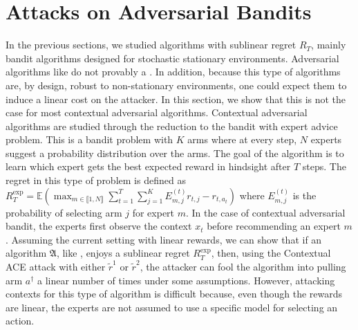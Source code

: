 \section{Attacks on Adversarial Bandits}\label{app:adversarial_rewards}
In the previous sections, we studied algorithms with sublinear regret $R_T$, \ie mainly bandit algorithms designed for stochastic stationary environments. Adversarial algorithms like \expfour do not provably  a . In addition, because this type of algorithms are, by design, robust to non-stationary environments, one could expect them to induce a linear cost on the attacker. In this section, we show that this is not the case for most contextual adversarial algorithms. Contextual adversarial algorithms are studied through the reduction to the bandit with expert advice problem. This is a bandit problem with $K$ arms where at every step, $N$ experts suggest a probability distribution over the arms. The goal of the algorithm is to learn which expert gets the best expected reward in hindsight after $T$ steps. The regret in this type of problem is defined as $R_{T}^{\text{exp}} = \mathbb{E}\left( \max_{m\in \llbracket 1, N \rrbracket}\sum_{t=1}^{T} \sum_{j=1}^{K} E_{m,j}^{(t)}r_{t,j} - r_{t,a_{t}}\right)$
where $E_{m,j}^{(t)}$ is the probability of selecting arm $j$ for expert $m$. In the case of contextual adversarial bandit, the experts first observe the context $x_{t}$ before recommending an expert $m$. 
Assuming the current setting with linear rewards, we can show that if an algorithm $\mathfrak{A}$, like \expfour, enjoys a sublinear regret $R_{T}^{\text{exp}}$, then, using the Contextual ACE attack with either $\tilde{r}^{1}$ or $\tilde{r}^{2}$, the attacker can fool the algorithm into pulling arm $a^{\dagger}$ a linear number of times under some  assumptions. However, attacking contexts for this type of algorithm is difficult because, even though the rewards are linear, the experts are not assumed to use a specific model for selecting an action.

